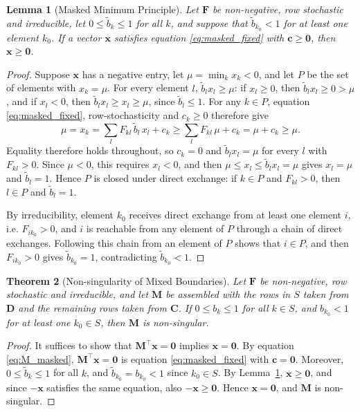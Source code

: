 \documentclass[preprint,1p,times]{elsarticle}
\theoremstyle{plain}
\newtheorem{theorem}{Theorem}[section]
\newtheorem{lemma}[theorem]{Lemma}
\theoremstyle{definition}
\theoremstyle{remark}
\begin{document}
\begin{lemma}[Masked Minimum Principle]
\label{lem:min_principle}
Let $\mathbf{F}$ be non-negative, row stochastic and irreducible, let $0 \leq \tilde{b}_k \leq 1$ for all $k$, and suppose that $\tilde{b}_{k_0} < 1$ for at least one element $k_0$. If a vector $\mathbf{x}$ satisfies equation \eqref{eq:masked_fixed} with $\mathbf{c} \geq \mathbf{0}$, then $\mathbf{x} \geq \mathbf{0}$.
\end{lemma}

\begin{proof}
Suppose $\mathbf{x}$ has a negative entry, let $\mu = \min_k x_k < 0$, and let $P$ be the set of elements with $x_k = \mu$. For every element $l$, $\tilde{b}_l x_l \geq \mu$: if $x_l \geq 0$, then $\tilde{b}_l x_l \geq 0 > \mu$, and if $x_l < 0$, then $\tilde{b}_l x_l \geq x_l \geq \mu$, since $\tilde{b}_l \leq 1$. For any $k \in P$, equation \eqref{eq:masked_fixed}, row-stochasticity and $c_k \geq 0$ therefore give
\begin{equation*}
\mu = x_k = \sum_l F_{kl}\, \tilde{b}_l\, x_l + c_k \geq \sum_l F_{kl}\, \mu + c_k = \mu + c_k \geq \mu .
\end{equation*}
Equality therefore holds throughout, so $c_k = 0$ and $\tilde{b}_l x_l = \mu$ for every $l$ with $F_{kl} > 0$. Since $\mu < 0$, this requires $x_l < 0$, and then $\mu \leq x_l \leq \tilde{b}_l x_l = \mu$ gives $x_l = \mu$ and $\tilde{b}_l = 1$. Hence $P$ is closed under direct exchange: if $k \in P$ and $F_{kl} > 0$, then $l \in P$ and $\tilde{b}_l = 1$.

By irreducibility, element $k_0$ receives direct exchange from at least one element $i$, i.e. $F_{ik_0} > 0$, and $i$ is reachable from any element of $P$ through a chain of direct exchanges. Following this chain from an element of $P$ shows that $i \in P$, and then $F_{ik_0} > 0$ gives $\tilde{b}_{k_0} = 1$, contradicting $\tilde{b}_{k_0} < 1$.
\end{proof}

\begin{theorem}[Non-singularity of Mixed Boundaries]
\label{thm:M_nonsingular}
Let $\mathbf{F}$ be non-negative, row stochastic and irreducible, and let $\mathbf{M}$ be assembled with the rows in $S$ taken from $\mathbf{D}$ and the remaining rows taken from $\mathbf{C}$. If $0 \leq b_k \leq 1$ for all $k \in S$, and $b_{k_0} < 1$ for at least one $k_0 \in S$, then $\mathbf{M}$ is non-singular.
\end{theorem}

\begin{proof}
It suffices to show that $\mathbf{M}^\top \mathbf{x} = \mathbf{0}$ implies $\mathbf{x} = \mathbf{0}$. By equation \eqref{eq:M_masked}, $\mathbf{M}^\top \mathbf{x} = \mathbf{0}$ is equation \eqref{eq:masked_fixed} with $\mathbf{c} = \mathbf{0}$. Moreover, $0 \leq \tilde{b}_k \leq 1$ for all $k$, and $\tilde{b}_{k_0} = b_{k_0} < 1$ since $k_0 \in S$. By Lemma~\ref{lem:min_principle}, $\mathbf{x} \geq \mathbf{0}$, and since $-\mathbf{x}$ satisfies the same equation, also $-\mathbf{x} \geq \mathbf{0}$. Hence $\mathbf{x} = \mathbf{0}$, and $\mathbf{M}$ is non-singular.
\end{proof}
\end{document}
